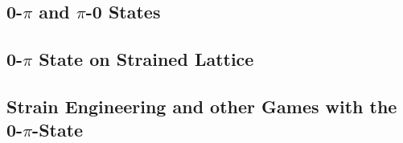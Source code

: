 \documentclass[../../../main.tex]{subfiles}
\begin{document}

\subsection{0-$\pi$ and $\pi$-0 States}


\subsection{0-$\pi$ State on Strained Lattice}


\subsection{Strain Engineering and other Games with the 0-$\pi$-State}


\end{document}
